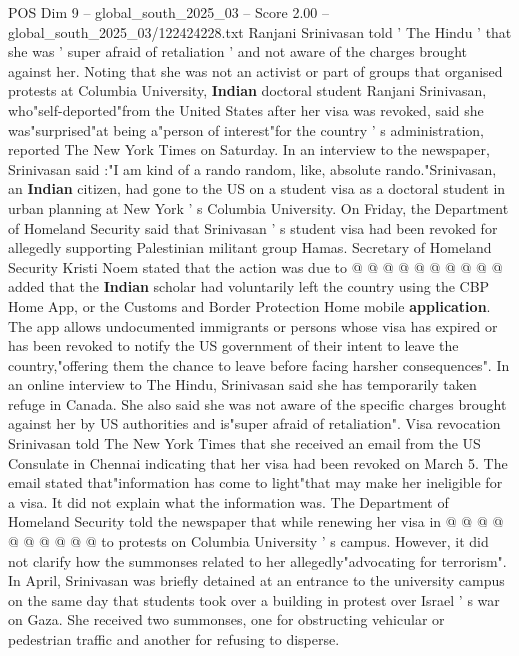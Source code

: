 \begin{textsample}{POS Dim 9 – global\_south\_2025\_03 – Score 2.00 – global\_south\_2025\_03/122424228.txt}  \label{ex:f9_pos_048}
Ranjani Srinivasan told ' The Hindu ' that she was ' super afraid of retaliation ' and not aware of the charges brought against her.
Noting that she was not an activist or part of groups that organised protests at Columbia University, \textbf{Indian} doctoral student Ranjani Srinivasan, who"self-deported"from the United States after her visa was revoked, said she was"surprised"at being a"person of interest"for the country ' s administration, reported The New York Times on Saturday.
In an interview to the newspaper, Srinivasan said :"I am kind of a rando random, like, absolute rando."Srinivasan, an \textbf{Indian} citizen, had gone to the US on a student visa as a doctoral student in urban planning at New York ' s Columbia University.
On Friday, the Department of Homeland Security said that Srinivasan ' s student visa had been revoked for allegedly supporting Palestinian militant group Hamas.
Secretary of Homeland Security Kristi Noem stated that the action was due to @ @ @ @ @ @ @ @ @ @ added that the \textbf{Indian} scholar had voluntarily left the country using the CBP Home App, or the Customs and Border Protection Home mobile \textbf{application}.
The app allows undocumented immigrants or persons whose visa has expired or has been revoked to notify the US government of their intent to leave the country,"offering them the chance to leave before facing harsher consequences".
In an online interview to The Hindu, Srinivasan said she has temporarily taken refuge in Canada.
She also said she was not aware of the specific charges brought against her by US authorities and is"super afraid of retaliation".
Visa revocation Srinivasan told The New York Times that she received an email from the US Consulate in Chennai indicating that her visa had been revoked on March 5.
The email stated that"information has come to light"that may make her ineligible for a visa.
It did not explain what the information was.
The Department of Homeland Security told the newspaper that while renewing her visa in @ @ @ @ @ @ @ @ @ @ to protests on Columbia University ' s campus.
However, it did not clarify how the summonses related to her allegedly"advocating for terrorism".
In April, Srinivasan was briefly detained at an entrance to the university campus on the same day that students took over a building in protest over Israel ' s war on Gaza.
She received two summonses, one for obstructing vehicular or pedestrian traffic and another for refusing to disperse.

\end{textsample}

